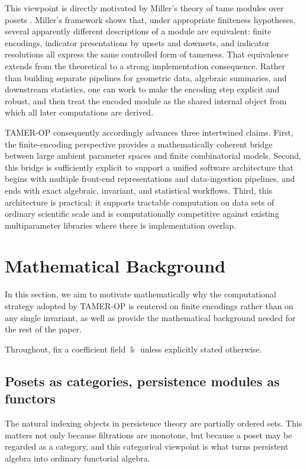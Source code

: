 \documentclass[11pt]{article}
\newcommand{\kk}{\Bbbk}
\newcommand{\TAMER}{\textsc{TAMER-OP}}
\theoremstyle{definition}
\theoremstyle{remark}
\begin{document}
This viewpoint is directly motivated by Miller's theory of tame modules over posets \cite{Mil20}. Miller's framework shows that, under appropriate finiteness hypotheses, several apparently different descriptions of a module are equivalent: finite encodings, indicator presentations by upsets and downsets, and indicator resolutions all express the same controlled form of tameness. That equivalence extends from the theoretical to a strong implementation consequence. Rather than building separate pipelines for geometric data, algebraic summaries, and downstream statistics, one can work to make the encoding step explicit and robust, and then treat the encoded module as the shared internal object from which all later computations are derived.

\TAMER{} consequently accordingly advances three intertwined claims. First, the finite-encoding perspective provides a mathematically coherent bridge between large ambient parameter spaces and finite combinatorial models. Second, this bridge is sufficiently explicit to support a unified software architecture that begins with multiple front-end representations and data-ingestion pipelines, and ends with exact algebraic, invariant, and statistical workflows. Third, this architecture is practical: it supports tractable computation on data sets of ordinary scientific scale and is computationally competitive against existing multiparameter libraries where there is implementation overlap.


\section{Mathematical Background}\label{sec:background}

In this section, we aim to motivate mathematically why the computational strategy adopted by \TAMER{} is centered on finite encodings rather than on any single invariant, as well as provide the mathematical background needed for the rest of the paper.

Throughout, fix a coefficient field $\kk$ unless explicitly stated otherwise.

\subsection{Posets as categories, persistence modules as functors}

The natural indexing objects in persistence theory are partially ordered sets.  This matters not only because filtrations are monotone, but because a poset may be regarded as a category, and this categorical viewpoint is what turns persistent algebra into ordinary functorial algebra.
\end{document}
